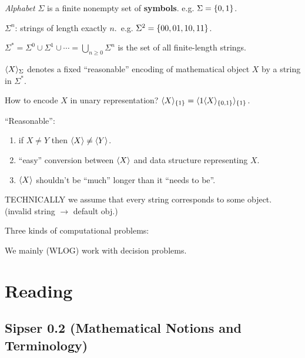\documentclass{article}
\begin{document}
\begin{definition}
  \textit{Alphabet} \(\Sigma\) is a finite nonempty set of \textbf{symbols}. e.g. \(\Sigma = \lbrace0, 1\rbrace\).
\end{definition}

\begin{definition}
  \(\Sigma^n\): strings of length exactly \(n\).\ e.g. \(\Sigma^2 = \lbrace00, 01, 10, 11\rbrace\).
\end{definition}

\begin{definition}
  \(\Sigma^* = \Sigma^0 \cup \Sigma^1 \cup \cdots = \bigcup_{n \geq 0} \Sigma^n\) is the set of all finite-length strings.
\end{definition}

\begin{definition}
  \(\langle X\rangle_{\Sigma}\) denotes a fixed ``reasonable'' encoding of mathematical object \(X\) by a string in \(\Sigma^*\).
\end{definition}
How to encode \(X\) in unary representation? \(\langle X\rangle_{\lbrace1\rbrace} = \langle1 \langle X\rangle_{\lbrace0, 1\rbrace}\rangle_{\lbrace1\rbrace}\).

\begin{mdframed}
  ``Reasonable'':
  \begin{enumerate}
    \item if \(X \neq Y\) then \(\langle X\rangle \neq \langle Y\rangle\).
    \item ``easy'' conversion between \(\langle X\rangle\) and data structure representing \(X\).
    \item \(\langle X\rangle\) shouldn't be ``much'' longer than it ``needs to be''.
  \end{enumerate}
\end{mdframed}

TECHNICALLY we assume that every string corresponds to some object. (invalid string \(\to\) default obj.)

\begin{mdframed}
  Three kinds of computational problems:
\end{mdframed}

We mainly (WLOG) work with decision problems.

\section{Reading}

\subsection{Sipser 0.2 (Mathematical Notions and Terminology)}
\end{document}
